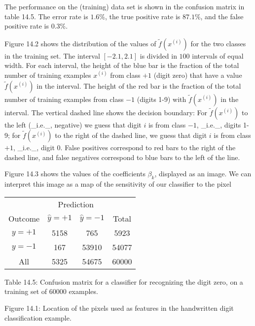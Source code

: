 The performance on the (training) data set is shown in the confusion matrix in table 14.5. The error rate is \(1.6\%\), the true positive rate is \(87.1\%\), and the false positive rate is \(0.3\%\).

Figure 14.2 shows the distribution of the values of \(\tilde{f}(x^{(i)})\) for the two classes in the training set. The interval \([-2.1,2.1]\) is divided in \(100\) intervals of equal width. For each interval, the height of the blue bar is the fraction of the total number of training examples \(x^{(i)}\) from class \(+1\) (digit zero) that have a value \(\tilde{f}(x^{(i)})\) in the interval. The height of the red bar is the fraction of the total number of training examples from class \(-1\) (digits 1-9) with \(\tilde{f}(x^{(i)})\) in the interval. The vertical dashed line shows the decision boundary: For \(\tilde{f}(x^{(i)})\) to the left (_i.e._, negative) we guess that digit \(i\) is from class \(-1\), _i.e._, digits 1-9; for \(\tilde{f}(x^{(i)})\) to the right of the dashed line, we guess that digit \(i\) is from class \(+1\), _i.e._, digit 0. False positives correspond to red bars to the right of the dashed line, and false negatives correspond to blue bars to the left of the line.

Figure 14.3 shows the values of the coefficients \(\beta_{k}\), displayed as an image. We can interpret this image as a map of the sensitivity of our classifier to the pixel

\begin{table}
\begin{tabular}{c c c c} \hline \hline  & \multicolumn{2}{c}{Prediction} \\ \cline{2-4} Outcome & \(\hat{y}=+1\) & \(\hat{y}=-1\) & Total \\ \hline \(y=+1\) & 5158 & 765 & 5923 \\ \(y=-1\) & 167 & 53910 & 54077 \\ All & 5325 & 54675 & 60000 \\ \hline \hline \end{tabular}
\end{table}
Table 14.5: Confusion matrix for a classifier for recognizing the digit zero, on a training set of 60000 examples.

Figure 14.1: Location of the pixels used as features in the handwritten digit classification example.

 